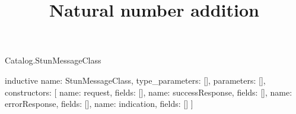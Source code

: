 \begin{lexlean}{Catalog.StunMessageClass}
\title{Natural number addition}
\begin{semanticmodule}
inductive{
  name: StunMessageClass,
  type_parameters: [],
  parameters: [],
  constructors: [
    {name: request, fields: []},
    {name: successResponse, fields: []},
    {name: errorResponse, fields: []},
    {name: indication, fields: []}
  ]
}
\end{semanticmodule}
\end{lexlean}
